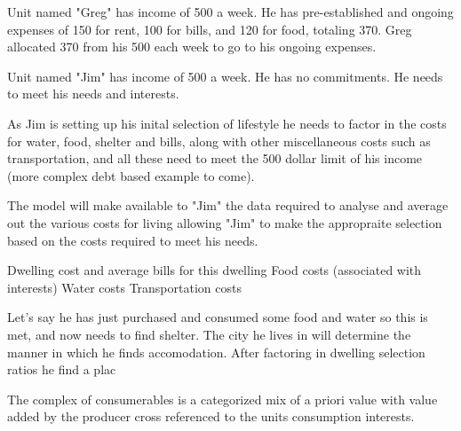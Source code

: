 




Unit named "Greg" has income of 500 a week. He has pre-established and ongoing expenses of 150 for rent, 100 for bills, and 120 for food, totaling 370. Greg allocated 370 from his 500 each week to go to his ongoing expenses. 

Unit named "Jim" has income of 500 a week. He has no commitments. He needs to meet his needs and interests. 

As Jim is setting up his inital selection of lifestyle he needs to factor in the costs for water, food, shelter and bills, along with other miscellaneous costs such as transportation, and all these need to meet the 500 dollar limit of his income (more complex debt based example to come).

The model will make available to "Jim" the data required to analyse and average out the various costs for living allowing "Jim" to make the appropraite selection based on the costs required to meet his needs.

Dwelling cost and average bills for this dwelling
Food costs (associated with interests)
Water costs
Transportation costs 




Let's say he has just purchased and consumed some food and water so this is met, and now needs to find shelter. The city he lives in will determine the manner in which he finds accomodation. After factoring in dwelling selection ratios he find a plac








The complex of consumerables is a categorized mix of a priori value with value added by the producer cross referenced to the units consumption interests.

